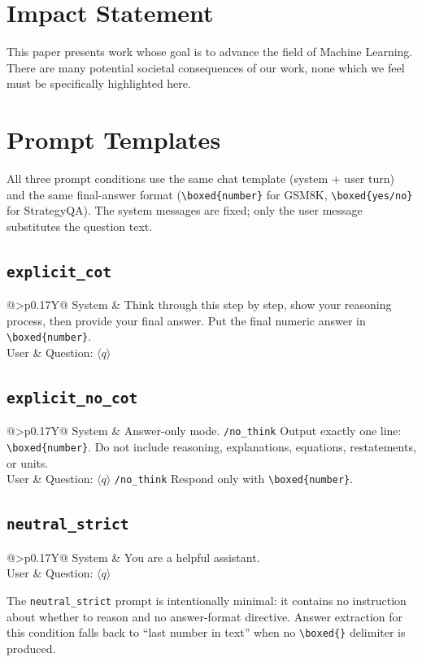 \documentclass{article}
\makeatletter
\newcommand{\promptblock}[3]{%
  \subsection*{\texttt{#1}}
  \begingroup
  \small
  \setlength{\tabcolsep}{6pt}
  \renewcommand{\arraystretch}{1.15}
  \noindent\begin{tabularx}{\linewidth}{@{}>{\bfseries}p{0.17\linewidth}Y@{}}
  System & #2 \\
  User & #3 \\
  \end{tabularx}
  \par\endgroup\medskip
}
\theoremstyle{plain}
\theoremstyle{definition}
\theoremstyle{remark}
\makeatother
\begin{document}
\section*{Impact Statement}

This paper presents work whose goal is to advance the field of Machine
Learning. There are many potential societal consequences of our work, none
which we feel must be specifically highlighted here.





\clearpage
\appendix

\section{Prompt Templates}
\label{app:prompts}

All three prompt conditions use the same chat template (system + user
turn) and the same final-answer format
(\texttt{\textbackslash boxed\{number\}} for GSM8K,
\texttt{\textbackslash boxed\{yes/no\}} for StrategyQA). The system messages are
fixed; only the user message substitutes the question text.

\promptblock{explicit\_cot}
  {Think through this step by step, show your reasoning process, then
  provide your final answer. Put the final numeric answer in
  \texttt{\textbackslash boxed\{number\}}.}
  {Question: $\langle q\rangle$}

\promptblock{explicit\_no\_cot}
  {Answer-only mode. \texttt{/no\_think}\newline
  Output exactly one line: \texttt{\textbackslash boxed\{number\}}. Do not include
  reasoning, explanations, equations, restatements, or units.}
  {Question: $\langle q\rangle$\newline
  \texttt{/no\_think}\newline
  Respond only with \texttt{\textbackslash boxed\{number\}}.}

\promptblock{neutral\_strict}
  {You are a helpful assistant.}
  {Question: $\langle q\rangle$}

The \texttt{neutral\_strict} prompt is intentionally minimal: it
contains no instruction about whether to reason and no answer-format
directive. Answer extraction for this condition falls back to
``last number in text'' when no \texttt{\textbackslash boxed\{\}} delimiter is produced.
\end{document}
